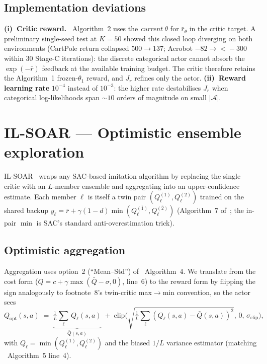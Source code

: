\documentclass[10pt]{article}
\newcommand{\Aspace}{\mathcal{A}}
\newcommand{\rb}{\bar{r}}
\begin{document}
\subsection{Implementation deviations}

\textbf{(i)~Critic reward.} \cite{watson2023csil}~Algorithm~2 uses the
\emph{current} $\theta$ for $\rb_\theta$ in the critic target. A
preliminary single-seed test at $K\!=\!50$ showed this closed loop
diverging on both environments (CartPole return collapsed
$500\!\to\!137$; Acrobot $-82\!\to\!\!<\!-300$ within $30$ Stage-C
iterations): the discrete categorical actor cannot absorb the
$\exp(-\rb)$ feedback at the available training budget. The critic
therefore retains the Algorithm~1 frozen-$\theta_1$ reward, and
$J_r$ refines only the actor.
\textbf{(ii)~Reward learning rate} $10^{-4}$ instead of $10^{-3}$:
the higher rate destabilises $J_r$ when categorical log-likelihoods
span $\sim\!10$ orders of magnitude on small $|\Aspace|$.

\section{IL-SOAR --- Optimistic ensemble exploration}\label{sec:soar}

IL-SOAR~\cite{viel2025ilsoar} wraps any SAC-based imitation algorithm
by replacing the single critic with an $L$-member ensemble and
aggregating into an upper-confidence estimate. Each member $\ell$ is
itself a twin pair $(Q^{(1)}_\ell,Q^{(2)}_\ell)$ trained on the
shared backup
$y_\ell=\rb+\gamma(1-d)\min(Q^{\bar{(1)}}_\ell,Q^{\bar{(2)}}_\ell)$
(Algorithm~7 of~\cite{viel2025ilsoar}; the in-pair $\min$ is SAC's
standard anti-overestimation trick).

\subsection{Optimistic aggregation}

Aggregation uses option~2 (``Mean--Std'') of
\cite{viel2025ilsoar}~Algorithm~4. We translate from the cost form
($Q=c+\gamma\max(\bar Q-\sigma,0)$, line~6) to the reward form by
flipping the sign analogously to footnote~8's twin-critic max$\to$min
convention, so the actor sees
\begin{equation}\label{eq:Qopt}
  Q_{\mathrm{opt}}(s,a)
  \;=\;\underbrace{\tfrac{1}{L}\textstyle\sum_{\ell}\,Q_\ell(s,a)}_{\bar{Q}(s,a)}
  \;+\;\mathrm{clip}\!\Big(\sqrt{\tfrac{1}{L}\textstyle\sum_{\ell}(Q_\ell(s,a)-\bar Q(s,a))^2},\,0,\,\sigma_{\mathrm{clip}}\Big),
\end{equation}
with $Q_\ell\!=\!\min(Q^{(1)}_\ell,Q^{(2)}_\ell)$ and the biased $1/L$
variance estimator (matching \cite{viel2025ilsoar}~Algorithm~5 line~4).
\end{document}
